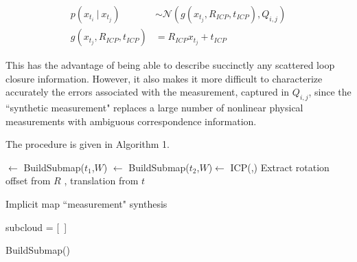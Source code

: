
%
%


\begin{align}
p\left(x_{t_i}~|~x_{t_j}\right) & \sim \mathcal{N}\left(g(x_{t_j},R_{ICP},t_{ICP}), Q_{i,j}\right) \\
g(x_{t_j},R_{ICP},t_{ICP}) &= R_{ICP}x_{t_j} + t_{ICP}
\end{align}

This has the advantage of being able to describe succinctly any scattered loop closure information. However, it also makes it more difficult to characterize accurately the errors associated with the measurement, captured in $Q_{i,j}$, since the ``synthetic measurement" replaces a large number of nonlinear physical measurements with ambiguous correspondence information.

The procedure is given in Algorithm 1.


\begin{algorithm}[H]
\DontPrintSemicolon
\SetAlgoLined
{}
\MapOne $\leftarrow$ BuildSubmap($t_1$,$W$) \;
\MapTwo $\leftarrow$ BuildSubmap($t_2$,$W$)\;
[$R$, $t$] $\leftarrow$ ICP(\MapOne,\MapTwo)  \;
Extract rotation offset from $R$ , translation from $t$\;
 \caption{Implicit map ``measurement" synthesis}
\end{algorithm} 


\begin{algorithm}[H]
\DontPrintSemicolon
\label{alg.submap}
\SetAlgoLined
{}
subcloud = [~] \;
\caption{BuildSubmap() \label{BSM}}
\end{algorithm}
~\\

